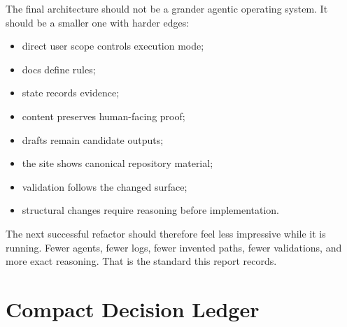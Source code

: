 \documentclass[a4paper,11pt,openany]{report}
\begin{document}
The final architecture should not be a grander agentic operating system. It
should be a smaller one with harder edges:

\begin{itemize}
  \item direct user scope controls execution mode;
  \item docs define rules;
  \item state records evidence;
  \item content preserves human-facing proof;
  \item drafts remain candidate outputs;
  \item the site shows canonical repository material;
  \item validation follows the changed surface;
  \item structural changes require reasoning before implementation.
\end{itemize}

The next successful refactor should therefore feel less impressive while it is
running. Fewer agents, fewer logs, fewer invented paths, fewer validations, and
more exact reasoning. That is the standard this report records.


\appendix

\chapter{Compact Decision Ledger}
\label{app:decision-ledger}
\end{document}
